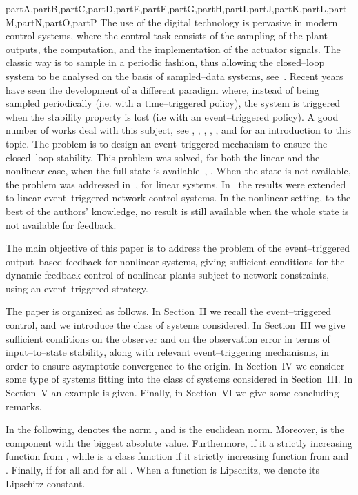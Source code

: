 \documentclass[letterpaper, 10 pt, conference]{ieeeconf}
\def\compile{partA,partB,partC,partD,partE,partF,partG,partH,partI,partJ,partK,partL,partM,partN,partO,partP}
\newenvironment{partA}[1][]{}{}
\begin{document}
\begin{xcomment}{\compile}
\begin{partA}
The use of the digital technology is pervasive in modern control systems, where the control task consists of the sampling of the plant outputs, the computation, and the implementation of the actuator signals. The classic way is to sample in a periodic fashion, thus allowing the closed--loop system to be analysed on the basis of sampled--data systems, see~\cite{Astrom 1997}. Recent years have seen the development of a different paradigm where, instead of being sampled periodically (i.e. with a time--triggered policy), the system is triggered when the stability property is lost (i.e with an event--triggered policy). A good number of works deal with this subject, see \cite{Astrom 2003}, \cite{Tabuada 2007}, \cite{Wang 2011}, \cite{Lunze 2010}, \cite{Heemels 2008}, and \cite{Heemels 2012} for an introduction to this topic. The problem is to design an event--triggered mechanism to ensure the closed--loop stability. This problem was solved, for both the linear and the nonlinear case, when the full state is available~\cite{Tabuada 2007}, \cite{Wang 2011}. When the  state is not available, the problem was addressed in~\cite{Lehmann 2011b}, \cite{Donkers 2012} for linear systems. In~\cite{Tallapragada 2013} the results were extended to linear event--triggered network control systems. In the nonlinear setting, to the best of the authors' knowledge, no result is still available when the whole state is not available for feedback.

The main objective of this paper is to address the problem of the event--triggered output--based feedback for nonlinear systems, giving sufficient conditions for the dynamic feedback control of nonlinear plants subject to network constraints, using an event--triggered strategy.


The paper is organized as follows. In Section~II we recall the event--triggered control, and we introduce the class of systems considered. In Section~III we give sufficient conditions on the observer and on the observation error in terms of input--to--state stability, along with relevant event--triggering mechanisms, in order to ensure asymptotic convergence to the origin. In Section~IV we consider some type of systems fitting into the class of systems considered in Section~III. In Section~V an example is given. Finally, in Section~VI we give some concluding remarks.


\medskip
{} In the following,  denotes the norm , and  is the euclidean norm. Moreover,  is the component with the biggest absolute value. Furthermore,   if it a strictly increasing function from , while  is a class  function if it  strictly increasing function from  and . Finally,  if  for all  and  for all . When a function  is Lipschitz, we denote  its Lipschitz constant.


\end{partA}
\end{xcomment}
\end{document}
